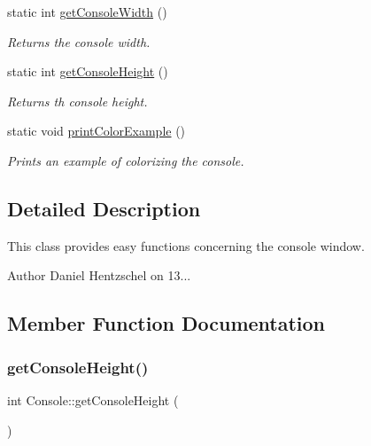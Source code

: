 \begin{DoxyCompactItemize}
static int \mbox{\hyperlink{class_console_ad8d4f4d8995f01c97ecb29da2460f7e4}{get\+Console\+Width}} ()
\begin{DoxyCompactList}\small\item\em Returns the console width. \end{DoxyCompactList}\item 
static int \mbox{\hyperlink{class_console_ac4ec7d76d4dc49eb757728e98b2a1941}{get\+Console\+Height}} ()
\begin{DoxyCompactList}\small\item\em Returns th console height. \end{DoxyCompactList}\item 
static void \mbox{\hyperlink{class_console_aa849da7a0a50a2b7439e5211cb07595f}{print\+Color\+Example}} ()
\begin{DoxyCompactList}\small\item\em Prints an example of colorizing the console. \end{DoxyCompactList}\end{DoxyCompactItemize}


\subsection{Detailed Description}
This class provides easy functions concerning the console window. 

\begin{DoxyAuthor}{Author}
Daniel Hentzschel on 13... 
\end{DoxyAuthor}


\subsection{Member Function Documentation}
\mbox{\label{class_console_ac4ec7d76d4dc49eb757728e98b2a1941}} 
\subsubsection{\texorpdfstring{getConsoleHeight()}{getConsoleHeight()}}
{\footnotesize\ttfamily int Console\+::get\+Console\+Height (\begin{DoxyParamCaption}{ }\end{DoxyParamCaption})\hspace{0.3cm}{\ttfamily [static]}}



